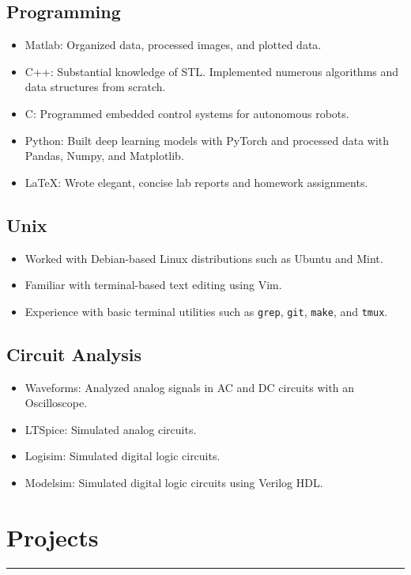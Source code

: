 \documentclass[10pt, letterpaper]{article}
\begin{document}
\subsection*{Programming}
\begin{itemize}[noitemsep]
	\item Matlab: Organized data, processed images, and plotted data.
	\item C++: Substantial knowledge of STL. Implemented numerous algorithms and data structures from scratch.
	\item C: Programmed embedded control systems for autonomous robots.
	\item Python: Built deep learning models with PyTorch and processed data with Pandas, Numpy, and Matplotlib.
	\item \LaTeX: Wrote elegant, concise lab reports and homework assignments.
\end{itemize}

\subsection*{Unix}
\begin{itemize}[noitemsep]
	\item Worked with Debian-based Linux distributions such as Ubuntu and Mint.
	\item Familiar with terminal-based text editing using Vim.
	\item Experience with basic terminal utilities such as \lstinline{grep}, \lstinline{git}, \lstinline{make}, and \lstinline{tmux}.
\end{itemize}

\subsection*{Circuit Analysis}
\begin{itemize}[noitemsep]
	\item Waveforms: Analyzed analog signals in AC and DC circuits with an Oscilloscope.	
	\item LTSpice: Simulated analog circuits.
	\item Logisim: Simulated digital logic circuits.
	\item Modelsim: Simulated digital logic circuits using Verilog HDL.
\end{itemize}

\section*{Projects}
\hrule
\vspace{7pt}
\end{document}
